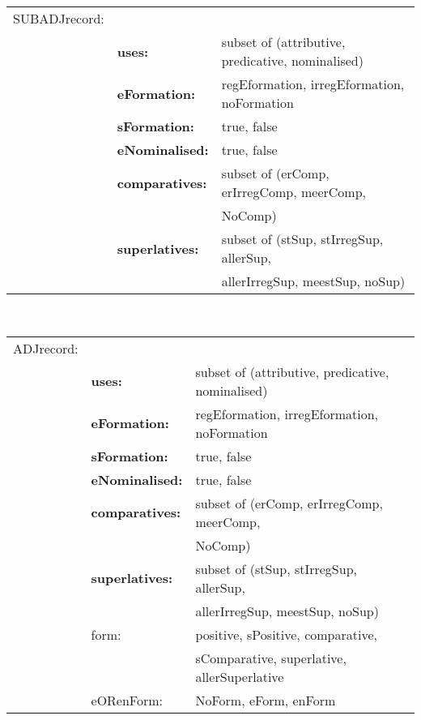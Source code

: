 \begin{tabular}{lll}
SUBADJrecord: &                   &              \\
            & {\bf uses:} & subset of (attributive, predicative, nominalised) \\
            & {\bf eFormation:}   & regEformation, irregEformation, noFormation \\
            & {\bf sFormation:}   & true, false \\
            & {\bf eNominalised:} & true, false \\
            & {\bf comparatives:} & subset of (erComp, erIrregComp, meerComp, \\
            &                     &     NoComp) \\
            & {\bf superlatives:} & subset of (stSup, stIrregSup, allerSup, \\
            &                     &  allerIrregSup, meestSup, noSup)  \\
\end{tabular}
\\
\begin{tabular}{lll}
ADJrecord: &                      &              \\
            & {\bf uses:} & subset of (attributive, predicative, nominalised) \\
            & {\bf eFormation:}   & regEformation, irregEformation, noFormation \\
            & {\bf sFormation:}   & true, false \\
            & {\bf eNominalised:} & true, false \\
            & {\bf comparatives:} & subset of (erComp, erIrregComp, meerComp, \\
            &                           &                           NoComp) \\
            & {\bf superlatives:} & subset of (stSup, stIrregSup, allerSup, \\
            &                           &  allerIrregSup, meestSup, noSup)   \\
            & form:                     & positive, sPositive, comparative,  \\
            &                           & sComparative, superlative, allerSuperlative \\
            & eORenForm:                & NoForm, eForm, enForm \\
\end{tabular}
\\
